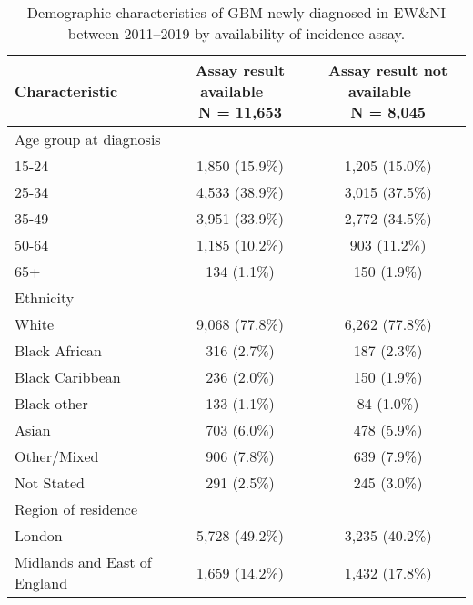 \begin{table}[!h]
\centering\centering
\caption{\label{tab:rita_demog}Demographic characteristics of GBM newly diagnosed in EW\&NI between 2011--2019 by availability of incidence assay.}
\centering
\begin{tabular}[t]{lcc}
\toprule
\textbf{Characteristic} & \makecell[c]{\textbf{Assay result available}\ \ \\N = 11,653} & \makecell[c]{\textbf{Assay result not available}\ \ \\N = 8,045}\\
\midrule
Age group at diagnosis &  & \\
\hspace{1em}15-24 & 1,850 (15.9\%) & 1,205 (15.0\%)\\
\hspace{1em}25-34 & 4,533 (38.9\%) & 3,015 (37.5\%)\\
\hspace{1em}35-49 & 3,951 (33.9\%) & 2,772 (34.5\%)\\
\hspace{1em}50-64 & 1,185 (10.2\%) & 903 (11.2\%)\\
\hspace{1em}65+ & 134 (1.1\%) & 150 (1.9\%)\\
Ethnicity &  & \\
\hspace{1em}White & 9,068 (77.8\%) & 6,262 (77.8\%)\\
\hspace{1em}Black African & 316 (2.7\%) & 187 (2.3\%)\\
\hspace{1em}Black Caribbean & 236 (2.0\%) & 150 (1.9\%)\\
\hspace{1em}Black other & 133 (1.1\%) & 84 (1.0\%)\\
\hspace{1em}Asian & 703 (6.0\%) & 478 (5.9\%)\\
\hspace{1em}Other/Mixed & 906 (7.8\%) & 639 (7.9\%)\\
\hspace{1em}Not Stated & 291 (2.5\%) & 245 (3.0\%)\\
Region of residence &  & \\
\hspace{1em}London & 5,728 (49.2\%) & 3,235 (40.2\%)\\
\hspace{1em}Midlands and East of England & 1,659 (14.2\%) & 1,432 (17.8\%)\\

\end{tabular}
\end{table}
